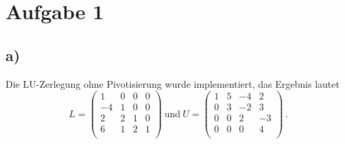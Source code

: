 \section{Aufgabe 1}
\subsection{a)}
Die LU-Zerlegung ohne Pivotisierung wurde implementiert, das Ergebnis lautet
\begin{equation}
  L =
  \begin{pmatrix}
    1 & 0 & 0 & 0 \\
    -4 & 1 & 0 & 0 \\
    2 & 2 & 1 & 0 \\
    6 & 1 & 2 & 1 \\
  \end{pmatrix}
  \ \text{und} \ U =
  \begin{pmatrix}
    1 & 5 & -4 & 2 \\
    0 & 3 & -2 & 3 \\
    0 & 0 & 2 & -3 \\
    0 & 0 & 0 & 4 \\
  \end{pmatrix} \, .
\end{equation}
